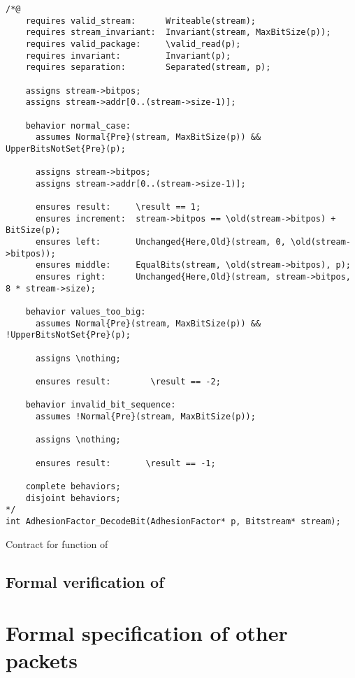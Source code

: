 \begin{listing}[hbt]
\begin{minipage}{0.99\textwidth}
\begin{lstlisting}[style=acsl-block]
/*@
    requires valid_stream:      Writeable(stream);
    requires stream_invariant:  Invariant(stream, MaxBitSize(p));
    requires valid_package:     \valid_read(p);
    requires invariant:         Invariant(p);
    requires separation:        Separated(stream, p);

    assigns stream->bitpos;
    assigns stream->addr[0..(stream->size-1)];

    behavior normal_case:
      assumes Normal{Pre}(stream, MaxBitSize(p)) && UpperBitsNotSet{Pre}(p);

      assigns stream->bitpos;
      assigns stream->addr[0..(stream->size-1)];

      ensures result:     \result == 1;
      ensures increment:  stream->bitpos == \old(stream->bitpos) + BitSize(p);
      ensures left:       Unchanged{Here,Old}(stream, 0, \old(stream->bitpos));
      ensures middle:     EqualBits(stream, \old(stream->bitpos), p);
      ensures right:      Unchanged{Here,Old}(stream, stream->bitpos, 8 * stream->size);

    behavior values_too_big:
      assumes Normal{Pre}(stream, MaxBitSize(p)) && !UpperBitsNotSet{Pre}(p);

      assigns \nothing;

      ensures result:        \result == -2;

    behavior invalid_bit_sequence:
      assumes !Normal{Pre}(stream, MaxBitSize(p));

      assigns \nothing;

      ensures result:       \result == -1;

    complete behaviors;
    disjoint behaviors;
*/
int AdhesionFactor_DecodeBit(AdhesionFactor* p, Bitstream* stream);
\end{lstlisting}
\end{minipage}
\caption{\label{lst:adhesionfactor-encodebit}Contract for  function of \adhesion}
\end{listing}

\FloatBarrier

\subsection{Formal verification of \adhesion}

\section{Formal specification of other packets}

